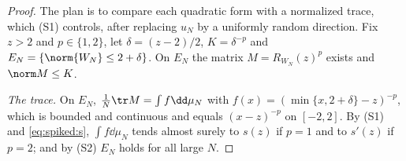\begin{refsection}

\begin{proof}
The plan is to compare each quadratic form with a normalized trace, which (S1) controls, after replacing $u_N$ by a uniformly random direction. Fix $z>2$ and $p\in\{1,2\}$, let $\delta=(z-2)/2$, $K=\delta^{-p}$ and $E_N=\{\norm{W_N}\le2+\delta\}$. On $E_N$ the matrix $M=R_{W_N}(z)^p$ exists and $\norm M\le K$.

\emph{The trace.} On $E_N$, $\frac1N\tr M=\int f\dd\mu_N$ with $f(x)=(\min\{x,2+\delta\}-z)^{-p}$, which is bounded and continuous and equals $(x-z)^{-p}$ on $[-2,2]$. By (S1) and \eqref{eq:spiked:s}, $\int f\dd\mu_N$ tends almost surely to $s(z)$ if $p=1$ and to $s'(z)$ if $p=2$; and by (S2) $E_N$ holds for all large $N$.


\end{proof}
\end{refsection}
